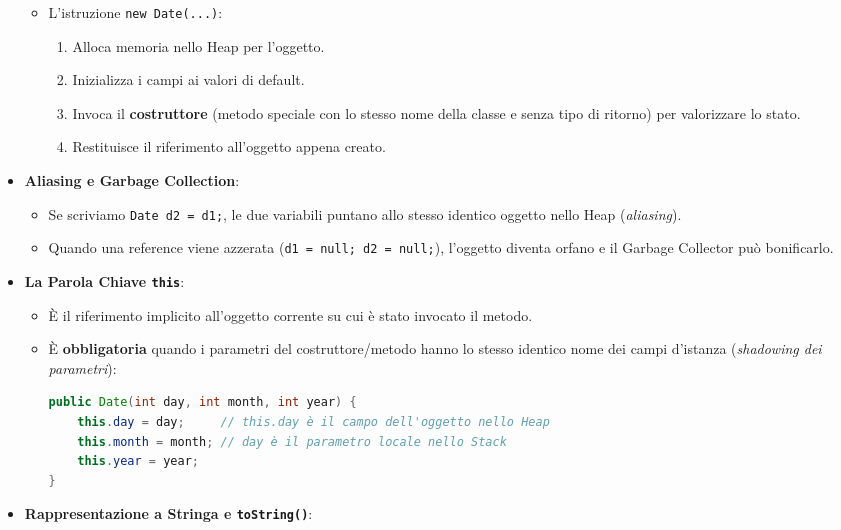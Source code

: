 \documentclass[11pt,a4paper,oneside]{report}
\newcommand{\passthrough}[1]{#1}
\providecommand{\tightlist}{\setlength{\itemsep}{0pt}\setlength{\parskip}{0pt}}
\begin{document}
\begin{itemize}
  \begin{itemize}
  \tightlist
  \item
    L'istruzione \passthrough{\lstinline!new Date(...)!}:

    \begin{enumerate}
    \def\labelenumi{\arabic{enumi}.}
    \tightlist
    \item
      Alloca memoria nello Heap per l'oggetto.
    \item
      Inizializza i campi ai valori di default.
    \item
      Invoca il \textbf{costruttore} (metodo speciale con lo stesso nome
      della classe e senza tipo di ritorno) per valorizzare lo stato.
    \item
      Restituisce il riferimento all'oggetto appena creato.
    \end{enumerate}
  \end{itemize}
\item
  \textbf{Aliasing e Garbage Collection}:

  \begin{itemize}
  \tightlist
  \item
    Se scriviamo \passthrough{\lstinline!Date d2 = d1;!}, le due
    variabili puntano allo stesso identico oggetto nello Heap
    (\emph{aliasing}).
  \item
    Quando una reference viene azzerata
    (\passthrough{\lstinline!d1 = null; d2 = null;!}), l'oggetto diventa
    orfano e il Garbage Collector può bonificarlo.
  \end{itemize}
\item
  \textbf{La Parola Chiave \passthrough{\lstinline!this!}}:

  \begin{itemize}
  \item
    È il riferimento implicito all'oggetto corrente su cui è stato
    invocato il metodo.
  \item
    È \textbf{obbligatoria} quando i parametri del costruttore/metodo
    hanno lo stesso identico nome dei campi d'istanza (\emph{shadowing
    dei parametri}):

\begin{lstlisting}[language=Java]
public Date(int day, int month, int year) {
    this.day = day;     // this.day è il campo dell'oggetto nello Heap
    this.month = month; // day è il parametro locale nello Stack
    this.year = year;
}
\end{lstlisting}
  \end{itemize}
\item
  \textbf{Rappresentazione a Stringa e
  \passthrough{\lstinline!toString()!}}:


\end{itemize}
\end{document}
